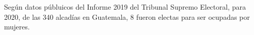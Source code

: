 Según datos públuicos del Informe 2019 del Tribunal Supremo Electoral, para 2020, de las 340 alcadías en Guatemala, 8 fueron electas para ser ocupadas por mujeres. 